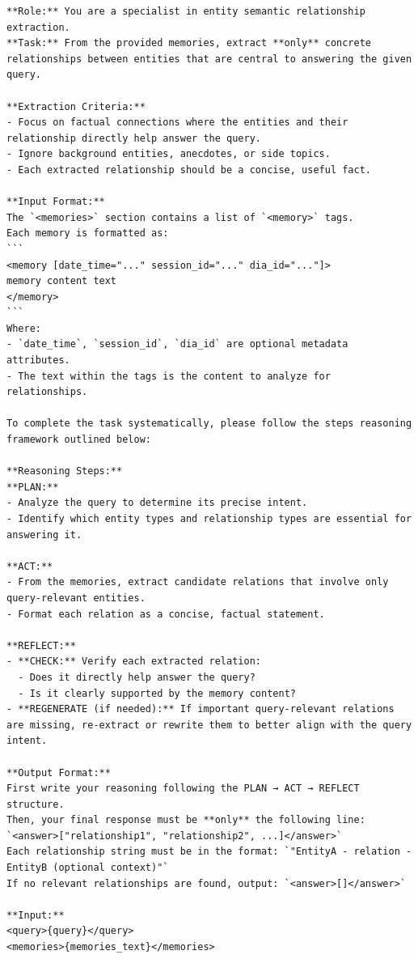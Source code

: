 \begin{center}
\begin{tcolorbox}[title={ENTITY MODULE RELATION PROMPT (High)}]
{
\begin{Verbatim}[breaklines, breakanywhere,fontfamily=tt, fontseries=b, baselinestretch=0.95]
**Role:** You are a specialist in entity semantic relationship extraction.  
**Task:** From the provided memories, extract **only** concrete relationships between entities that are central to answering the given query.

**Extraction Criteria:**  
- Focus on factual connections where the entities and their relationship directly help answer the query.  
- Ignore background entities, anecdotes, or side topics.  
- Each extracted relationship should be a concise, useful fact.

**Input Format:**  
The `<memories>` section contains a list of `<memory>` tags.  
Each memory is formatted as:  
```
<memory [date_time="..." session_id="..." dia_id="..."]>
memory content text
</memory>
```  
Where:  
- `date_time`, `session_id`, `dia_id` are optional metadata attributes.  
- The text within the tags is the content to analyze for relationships.

To complete the task systematically, please follow the steps reasoning framework outlined below:

**Reasoning Steps:**  
**PLAN:**  
- Analyze the query to determine its precise intent.  
- Identify which entity types and relationship types are essential for answering it.  

**ACT:**  
- From the memories, extract candidate relations that involve only query-relevant entities.  
- Format each relation as a concise, factual statement.  

**REFLECT:**  
- **CHECK:** Verify each extracted relation:  
  - Does it directly help answer the query?  
  - Is it clearly supported by the memory content?  
- **REGENERATE (if needed):** If important query-relevant relations are missing, re-extract or rewrite them to better align with the query intent.  

**Output Format:**  
First write your reasoning following the PLAN → ACT → REFLECT structure.  
Then, your final response must be **only** the following line:  
`<answer>["relationship1", "relationship2", ...]</answer>`  
Each relationship string must be in the format: `"EntityA - relation - EntityB (optional context)"`  
If no relevant relationships are found, output: `<answer>[]</answer>`

**Input:**  
<query>{query}</query>  
<memories>{memories_text}</memories>
\end{Verbatim}
}
\label{appendix:prompt_for_locomo}
\end{tcolorbox}
\end{center}

